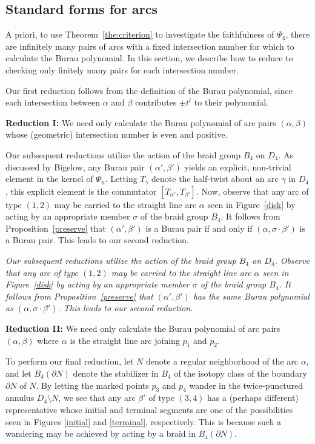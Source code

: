 \subsection{Standard forms for arcs}
\label{subsect:standardForms}
A priori, to use Theorem~\ref{the:criterion} to investigate the faithfulness of $\Psi_4$, there are infinitely many pairs of arcs with a fixed intersection number for which to calculate the Burau polynomial. In this section, we describe how to reduce to checking only finitely many pairs for each intersection number.

Our first reduction follows from the definition of the Burau polynomial, since each intersection between $\alpha$ and $\beta$ contributes $\pm t^i$ to their polynomial.

\textbf{Reduction I:} We need only calculate the Burau polynomial of arc pairs $(\alpha, \beta)$ whose (geometric) intersection number is even and positive.

Our subsequent reductions utilize the action of the braid group $B_4$ on $D_4$. As discussed by Bigelow, any Burau pair $(\alpha ', \beta ')$ yields an explicit, non-trivial element in the kernel of $\Psi_n$. Letting $T_{\gamma}$ denote the half-twist about an arc $\gamma$ in $D_4$, this explicit element is the commutator $[T_{\alpha '}, T_{\beta '}]$. Now, observe that any arc of type $(1,2)$ may be carried to the straight line arc $\alpha$ seen in Figure~\ref{disk} by acting by an appropriate member $\sigma$ of the braid group $B_4$. It follows from Proposition~\ref{preserve} that $(\alpha ', \beta ')$ is a Burau pair if and only if $(\alpha, \sigma \cdot \beta ')$ is a Burau pair. This leads to our second reduction.

\emph{Our subsequent reductions utilize the action of the braid group $B_4$ on $D_4$. Observe that any arc of type $(1,2)$ may be carried to the straight line arc $\alpha$ seen in Figure~\ref{disk} by acting by an appropriate member $\sigma$ of the braid group $B_4$. It follows from Proposition~\ref{preserve} that $(\alpha ', \beta ')$ has the same Burau polynomial as $(\alpha, \sigma \cdot \beta ')$. This leads to our second reduction.}

\textbf{Reduction II:} We need only calculate the Burau polynomial of arc pairs $(\alpha, \beta)$ where $\alpha$ is the straight line arc joining $p_1$ and $p_2$.

To perform our final reduction, let $N$ denote a regular neighborhood of the arc $\alpha$, and let $B_4(\partial N)$ denote the stabilizer in $B_4$ of the isotopy class of the boundary $\partial N$ of $N$. By letting the marked points $p_3$ and $p_4$ wander in the twice-punctured annulus $D_4 \setminus N$, we see that any arc $\beta '$ of type $(3,4)$ has a (perhaps different) representative whose initial and terminal segments are one of the possibilities seen in Figures \ref{initial} and \ref{terminal}, respectively. This is because such a wandering may be achieved by acting by a braid in $B_4(\partial N)$. 

